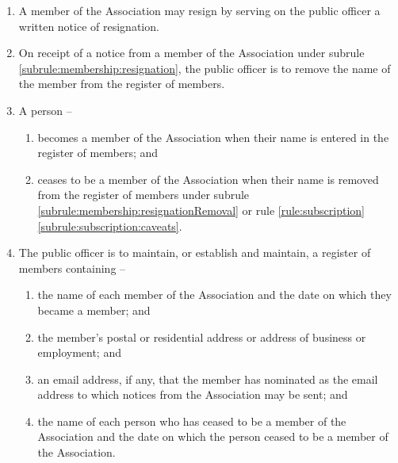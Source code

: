 \begin{enumerate}
	\item \label{subrule:membership:resignation} A member of the Association may resign by serving on the public officer a written notice of resignation.
	\item \label{subrule:membership:resignationRemoval} On receipt of a notice from a member of the Association under subrule \ref{subrule:membership:resignation}, the public officer is to remove the name of the member from the register of members.

	\item A person --
	\begin{enumerate}
		\item becomes a member of the Association when their name is entered in the register of members; and
		\item ceases to be a member of the Association when their name is removed from the register of members under subrule \ref{subrule:membership:resignationRemoval} or rule \ref{rule:subscription}\ref{subrule:subscription:caveats}.
	\end{enumerate}
	
	\item \label{subrule:membership:registry} The public officer is to maintain, or establish and maintain, a register of members containing --
	\begin{enumerate}
		\item the name of each member of the Association and the date on which they became a member; and
		\item the member's postal or residential address or address of business or employment; and
		\item an email address, if any, that the member has nominated as the email address to which notices from the Association may be sent; and
		\item the name of each person who has ceased to be a member of the Association and the date on which the person ceased to be a member of the Association.
	\end{enumerate}
	
\end{enumerate}